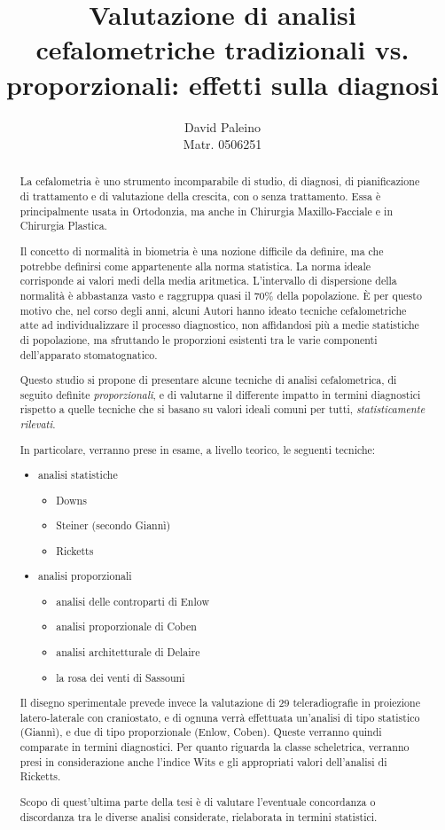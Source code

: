 \documentclass[a4paper,10pt]{article}
\title{Valutazione di analisi cefalometriche tradizionali vs. proporzionali: effetti sulla diagnosi}
\author{
David Paleino\\
\begingroup
\footnotesize
Matr. 0506251
\endgroup
}
\date{}
\begin{document}
\maketitle

\begin{abstract}
La cefalometria è uno strumento incomparabile di studio, di diagnosi, di pianificazione di trattamento e di valutazione della crescita, con o senza trattamento. Essa è principalmente usata in Ortodonzia, ma anche in Chirurgia Maxillo-Facciale e in Chirurgia Plastica.

Il concetto di normalità in biometria è una nozione difficile da definire, ma che potrebbe definirsi come appartenente alla norma statistica. La norma ideale corrisponde ai valori medi della media aritmetica. L’intervallo di dispersione della normalità è abbastanza vasto e raggruppa quasi il 70\% della popolazione. È per questo motivo che, nel corso degli anni, alcuni Autori hanno ideato tecniche cefalometriche atte ad individualizzare il processo diagnostico, non affidandosi più a medie statistiche di popolazione, ma sfruttando le proporzioni esistenti tra le varie componenti dell'apparato stomatognatico.

Questo studio si propone di presentare alcune tecniche di analisi cefalometrica, di seguito definite \emph{proporzionali}, e di valutarne il differente impatto in termini diagnostici rispetto a quelle tecniche che si basano su valori ideali comuni per tutti, \emph{statisticamente rilevati}.

In particolare, verranno prese in esame, a livello teorico, le seguenti tecniche:
\begin{itemize}
\item analisi statistiche
\begin{itemize}
\item Downs
\item Steiner (secondo Giannì)
\item Ricketts
\end{itemize}
\item analisi proporzionali
\begin{itemize}
\item analisi delle controparti di Enlow
\item analisi proporzionale di Coben
\item analisi architetturale di Delaire
\item la rosa dei venti di Sassouni
\end{itemize}
\end{itemize}

Il disegno sperimentale prevede invece la valutazione di 29 teleradiografie in proiezione latero-laterale con craniostato, e di ognuna verrà effettuata un'analisi di tipo statistico (Giannì), e due di tipo proporzionale (Enlow, Coben). Queste verranno quindi comparate in termini diagnostici. Per quanto riguarda la classe scheletrica, verranno presi in considerazione anche l'indice Wits e gli appropriati valori dell'analisi di Ricketts.

Scopo di quest'ultima parte della tesi è di valutare l'eventuale concordanza o discordanza tra le diverse analisi considerate, rielaborata in termini statistici.
\end{abstract}
\end{document}
